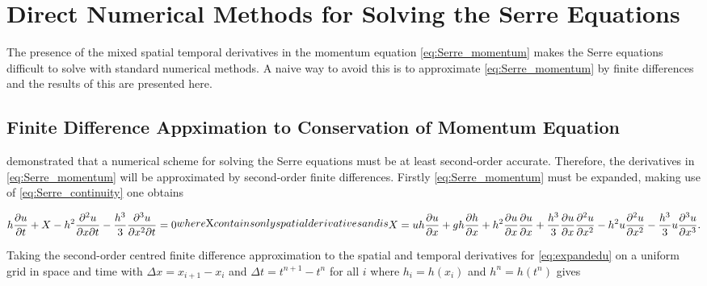 \documentclass[SingleSpace,12pt,Proceedings]{Serre_ASCE}
\begin{document}
\section{Direct Numerical Methods for Solving the Serre Equations} 
\label{sec:DirNumMet}
The presence of the mixed spatial temporal derivatives in the momentum equation \eqref{eq:Serre_momentum} makes the Serre equations difficult to solve with standard numerical methods. A naive way to avoid this is to approximate \eqref{eq:Serre_momentum} by finite differences and the results of this are presented here.
\subsection{Finite Difference Appximation to Conservation of Momentum Equation} 
\label{subsec:FDA2conmom}
 demonstrated that a numerical scheme for solving the Serre equations must be at least second-order accurate. Therefore, the derivatives in \eqref{eq:Serre_momentum} will be approximated by second-order finite differences. Firstly \eqref{eq:Serre_momentum} must be expanded, making use of \eqref{eq:Serre_continuity} one obtains
\begin{linenomath*}
\begin{subequations}
\begin{gather}
h\dfrac{\partial u}{\partial t} + X - h^2\frac{\partial^2 u}{\partial x \partial t} - \frac{h^3}{3}\frac{\partial^3 u}{\partial x^2 \partial t}  =0 
\label{eq:expandedu}
\end{gather}
where $X$ contains only spatial derivatives and is
\begin{gather}
X = uh\frac{\partial u}{\partial x} + gh\frac{\partial h}{\partial x} + h^2\frac{\partial u}{\partial x}\frac{\partial u}{\partial x} + \frac{h^3}{3}\frac{\partial u}{\partial x}\frac{\partial^2 u}{\partial x^2} - h^2u\frac{\partial^2 u}{\partial x^2}- \frac{h^3}{3}u\frac{\partial^3 u}{\partial x^3} .
\end{gather}
\end{subequations}
\end{linenomath*} 
Taking the second-order centred finite difference approximation to the spatial and temporal derivatives for \eqref{eq:expandedu} on a uniform grid in space and time with $\Delta x  = x_{i+1} - x_i$ and $\Delta t  = t^{n+1} - t^n$ for all $i$ where $h_i = h(x_i)$ and $h^n = h(t^n)$ gives
\end{document}
